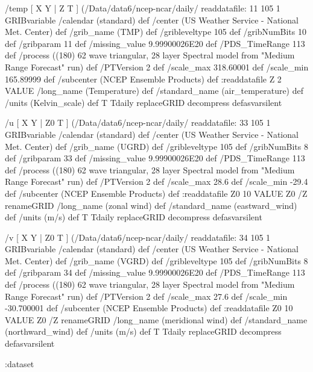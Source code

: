 \begin{ingrid}
   /temp { [ X Y | Z T ] (/Data/data6/ncep-ncar/daily/%
   readdatafile:
   11 105 1 GRIBvariable
   /calendar (standard) def
   /center (US Weather Service - National Met. Center) def
   /grib_name (TMP) def
   /gribleveltype 105 def
   /gribNumBits 10 def
   /gribparam 11 def
   /missing_value 9.99900026E20 def 
   /PDS_TimeRange 113 def
   /process ((180) 62 wave triangular, 28 layer Spectral model from "Medium Range Forecast" run) def
   /PTVersion 2 def
   /scale_max 318.60001 def
   /scale_min 165.89999 def
   /subcenter (NCEP Ensemble Products) def
   :readdatafile
   Z 2 VALUE
   /long_name (Temperature) def
   /standard_name (air_temperature) def
   /units (Kelvin_scale) def
   T Tdaily replaceGRID 
   decompress
   } defasvarsilent

   /u { [ X Y | Z0 T ] (/Data/data6/ncep-ncar/daily/%
   readdatafile:
   33 105 1 GRIBvariable
   /calendar (standard) def
   /center (US Weather Service - National Met. Center) def
   /grib_name (UGRD) def
   /gribleveltype 105 def
   /gribNumBits 8 def
   /gribparam 33 def
   /missing_value 9.99900026E20 def 
   /PDS_TimeRange 113 def
   /process ((180) 62 wave triangular, 28 layer Spectral model from "Medium Range Forecast" run) def
   /PTVersion 2 def
   /scale_max 28.6 def
   /scale_min -29.4 def
   /subcenter (NCEP Ensemble Products) def
   :readdatafile
   Z0 10 VALUE
   Z0 /Z renameGRID
   /long_name (zonal wind) def
   /standard_name (eastward_wind) def
   /units (m/s) def
   T Tdaily replaceGRID 
   decompress
   } defasvarsilent

   /v { [ X Y | Z0 T ] (/Data/data6/ncep-ncar/daily/%
   readdatafile:
   34 105 1 GRIBvariable
   /calendar (standard) def
   /center (US Weather Service - National Met. Center) def
   /grib_name (VGRD) def
   /gribleveltype 105 def
   /gribNumBits 8 def
   /gribparam 34 def
   /missing_value 9.99900026E20 def 
   /PDS_TimeRange 113 def
   /process ((180) 62 wave triangular, 28 layer Spectral model from "Medium Range Forecast" run) def
   /PTVersion 2 def
   /scale_max 27.6 def
   /scale_min -30.700001 def
   /subcenter (NCEP Ensemble Products) def
   :readdatafile
   Z0 10 VALUE
   Z0 /Z renameGRID
   /long_name (meridional wind) def
   /standard_name (northward_wind) def
   /units (m/s) def
   T Tdaily replaceGRID 
   decompress
   } defasvarsilent

 :dataset
 
\end{ingrid}

